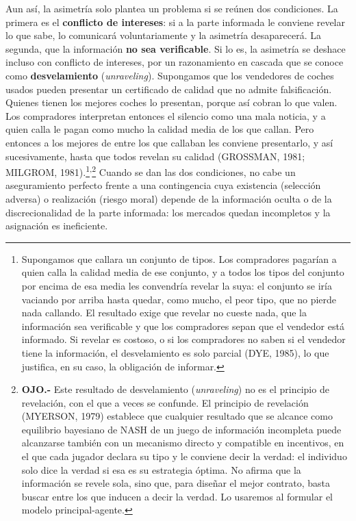 \documentclass[10pt,a4paper]{article}
\begin{document}
Aun así, la asimetría solo plantea un problema si se reúnen dos condiciones. La primera es el \textbf{conflicto de intereses}: si a la parte informada le conviene revelar lo que sabe, lo comunicará voluntariamente y la asimetría desaparecerá. La segunda, que la información \textbf{no sea verificable}. Si lo es, la asimetría se deshace incluso con conflicto de intereses, por un razonamiento en cascada que se conoce como \textbf{desvelamiento} (\textit{unraveling}). Supongamos que los vendedores de coches usados pueden presentar un certificado de calidad que no admite falsificación. Quienes tienen los mejores coches lo presentan, porque así cobran lo que valen. Los compradores interpretan entonces el silencio como una mala noticia, y a quien calla le pagan como mucho la calidad media de los que callan. Pero entonces a los mejores de entre los que callaban les conviene presentarlo, y así sucesivamente, hasta que todos revelan su calidad (GROSSMAN, 1981; MILGROM, 1981).\footnote{%
    Supongamos que callara un conjunto de tipos. Los compradores pagarían a quien calla la calidad media de ese conjunto, y a todos los tipos del conjunto por encima de esa media les convendría revelar la suya: el conjunto se iría vaciando por arriba hasta quedar, como mucho, el peor tipo, que no pierde nada callando. El resultado exige que revelar no cueste nada, que la información sea verificable y que los compradores sepan que el vendedor está informado. Si revelar es costoso, o si los compradores no saben si el vendedor tiene la información, el desvelamiento es solo parcial (DYE, 1985), lo que justifica, en su caso, la obligación de informar.
}\textsuperscript{,}\footnote{%
    \textbf{OJO.-} Este resultado de desvelamiento (\textit{unraveling}) no es el principio de revelación, con el que a veces se confunde. El principio de revelación (MYERSON, 1979) establece que cualquier resultado que se alcance como equilibrio bayesiano de NASH de un juego de información incompleta puede alcanzarse también con un mecanismo directo y compatible en incentivos, en el que cada jugador declara su tipo y le conviene decir la verdad: el individuo solo dice la verdad si esa es su estrategia óptima. No afirma que la información se revele sola, sino que, para diseñar el mejor contrato, basta buscar entre los que inducen a decir la verdad. Lo usaremos al formular el modelo principal-agente.
} Cuando se dan las dos condiciones, no cabe un aseguramiento perfecto frente a una contingencia cuya existencia (selección adversa) o realización (riesgo moral) depende de la información oculta o de la discrecionalidad de la parte informada: los mercados quedan incompletos y la asignación es ineficiente.
\end{document}
